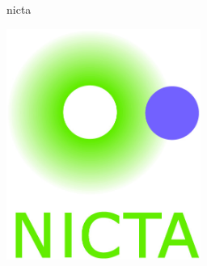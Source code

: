 \documentclass[a0,landscape]{a0poster}
\begin{document}
\begin{staticcontents*}{nicta}
\begin{staticfigure}
\begin{center}
\includegraphics[width=2.5in]{diagrams/nicta_logo.jpg}
\end{center}
\end{staticfigure}
\end{staticcontents*}






%
%
\end{document}
